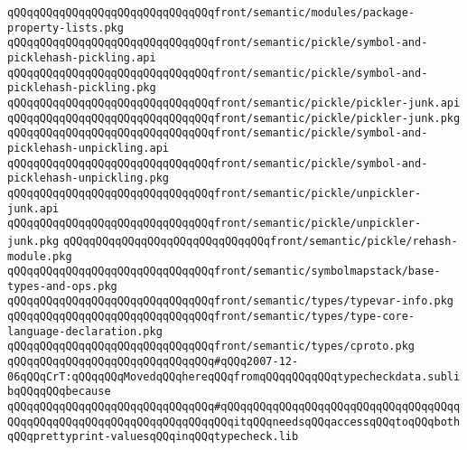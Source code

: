\verb|qQQqqQQqqQQqqQQqqQQqqQQqqQQqqQQqfront/semantic/modules/package-property-lists.pkg|\newline
\newline
\verb|qQQqqQQqqQQqqQQqqQQqqQQqqQQqqQQqfront/semantic/pickle/symbol-and-picklehash-pickling.api|\newline
\verb|qQQqqQQqqQQqqQQqqQQqqQQqqQQqqQQqfront/semantic/pickle/symbol-and-picklehash-pickling.pkg|\newline
\newline
\verb|qQQqqQQqqQQqqQQqqQQqqQQqqQQqqQQqfront/semantic/pickle/pickler-junk.api|\newline
\verb|qQQqqQQqqQQqqQQqqQQqqQQqqQQqqQQqfront/semantic/pickle/pickler-junk.pkg|\newline
\newline
\verb|qQQqqQQqqQQqqQQqqQQqqQQqqQQqqQQqfront/semantic/pickle/symbol-and-picklehash-unpickling.api|\newline
\verb|qQQqqQQqqQQqqQQqqQQqqQQqqQQqqQQqfront/semantic/pickle/symbol-and-picklehash-unpickling.pkg|\newline
\newline
\verb|qQQqqQQqqQQqqQQqqQQqqQQqqQQqqQQqfront/semantic/pickle/unpickler-junk.api|\newline
\verb|qQQqqQQqqQQqqQQqqQQqqQQqqQQqqQQqfront/semantic/pickle/unpickler-junk.pkg|\newline
\newline
\verb|qQQqqQQqqQQqqQQqqQQqqQQqqQQqqQQqfront/semantic/pickle/rehash-module.pkg|\newline
\newline
\verb|qQQqqQQqqQQqqQQqqQQqqQQqqQQqqQQqfront/semantic/symbolmapstack/base-types-and-ops.pkg|\newline
\newline
\verb|qQQqqQQqqQQqqQQqqQQqqQQqqQQqqQQqfront/semantic/types/typevar-info.pkg|\newline
\verb|qQQqqQQqqQQqqQQqqQQqqQQqqQQqqQQqfront/semantic/types/type-core-language-declaration.pkg|\newline
\verb|qQQqqQQqqQQqqQQqqQQqqQQqqQQqqQQqfront/semantic/types/cproto.pkg|\newline
\newline
\verb|qQQqqQQqqQQqqQQqqQQqqQQqqQQqqQQq#qQQq2007-12-06qQQqCrT:qQQqqQQqMovedqQQqhereqQQqfromqQQqqQQqqQQqtypecheckdata.sublibqQQqqQQqbecause|\newline
\verb|qQQqqQQqqQQqqQQqqQQqqQQqqQQqqQQq#qQQqqQQqqQQqqQQqqQQqqQQqqQQqqQQqqQQqqQQqqQQqqQQqqQQqqQQqqQQqqQQqqQQqqQQqitqQQqneedsqQQqaccessqQQqtoqQQqbothqQQqprettyprint-valuesqQQqinqQQqtypecheck.lib|\newline
